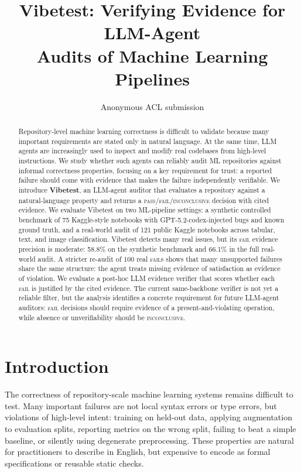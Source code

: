 \documentclass[11pt]{article}
\title{Vibetest: Verifying Evidence for LLM-Agent\\Audits of Machine Learning Pipelines}
\author{Anonymous ACL submission}
\begin{document}
\maketitle

\begin{abstract}
Repository-level machine learning correctness is difficult to validate because many important requirements are stated only in natural language.
At the same time, LLM agents are increasingly used to inspect and modify real codebases from high-level instructions.
We study whether such agents can reliably audit ML repositories against informal correctness properties, focusing on a key requirement for trust: a reported failure should come with evidence that makes the failure independently verifiable.
We introduce \textbf{Vibetest}, an LLM-agent auditor that evaluates a repository against a natural-language property and returns a \textsc{pass}/\textsc{fail}/\textsc{inconclusive} decision with cited evidence.
We evaluate Vibetest on two ML-pipeline settings: a synthetic controlled benchmark of 75 Kaggle-style notebooks with GPT-5.2-codex-injected bugs and known ground truth, and a real-world audit of 121 public Kaggle notebooks across tabular, text, and image classification.
Vibetest detects many real issues, but its \textsc{fail} evidence precision is moderate: 58.8\% on the synthetic benchmark and 66.1\% in the full real-world audit.
A stricter re-audit of 100 real \textsc{fail}s shows that many unsupported failures share the same structure: the agent treats missing evidence of satisfaction as evidence of violation.
We evaluate a post-hoc LLM evidence verifier that scores whether each \textsc{fail} is justified by the cited evidence.
The current same-backbone verifier is not yet a reliable filter, but the analysis identifies a concrete requirement for future LLM-agent auditors: \textsc{fail} decisions should require evidence of a present-and-violating operation, while absence or unverifiability should be \textsc{inconclusive}.
\end{abstract}

\section{Introduction}

The correctness of repository-scale machine learning systems remains difficult to test.
Many important failures are not local syntax errors or type errors, but violations of high-level intent: training on held-out data, applying augmentation to evaluation splits, reporting metrics on the wrong split, failing to beat a simple baseline, or silently using degenerate preprocessing.
These properties are natural for practitioners to describe in English, but expensive to encode as formal specifications or reusable static checks.
\end{document}

